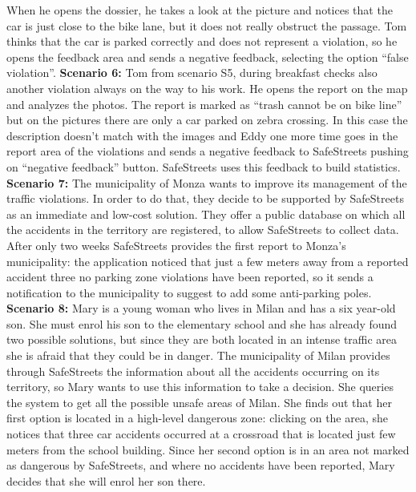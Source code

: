 \documentclass[../RASD.tex]{subfiles}
\begin{document}
                When he opens the dossier, he takes a look at the picture and notices that the car is just close to the bike lane,
                but it does not really obstruct the passage.
                Tom thinks that the car is parked correctly and does not represent a violation, so he opens the feedback area and sends a negative feedback,
                selecting the option “false violation”.
                \newline
                \newline
                \textbf{Scenario 6:} Tom from scenario S5, during breakfast checks also another violation always on the way to his work.
                 He opens the report on the map and analyzes the photos.
                 The report is marked as “trash cannot be on bike line” but on the pictures there are only a car parked on zebra crossing.
                 In this case the description doesn’t match with the images and Eddy one more time goes in the report area of the violations and sends
                 a negative feedback to SafeStreets pushing on “negative feedback” button.
                 SafeStreets uses this feedback to build statistics.
                \newline
                \newline
                \textbf{Scenario 7:} The municipality of Monza wants to improve its management of the traffic violations.
                In order to do that, they decide to be supported by SafeStreets as an immediate and low-cost solution.
                They offer a public database on which all the accidents in the territory are registered, to allow SafeStreets to collect data.
                After only two weeks SafeStreets provides the first report to Monza’s municipality: the application noticed that just a few meters away
                from a reported accident three no parking zone violations have been reported, so it sends a notification to the municipality
                to suggest to add some anti-parking poles.
                \newline
                \newline
                \textbf{Scenario 8:} Mary is a young woman who lives in Milan and has a six year-old son.
                She must enrol his son to the elementary school and she has already found two possible solutions, but since they are both
                located in an intense traffic area she is afraid that they could be in danger.
                The municipality of Milan provides through SafeStreets the information about all the accidents occurring on its territory,
                so Mary wants to use this information to take a decision.
                She queries the system to get all the possible unsafe areas of Milan.
                She finds out that her first option is located in a high-level dangerous zone: clicking on the area, she notices that three car accidents
                occurred at a crossroad that is located just few meters from the school building.
                Since her second option is in an area not marked as dangerous by SafeStreets, and where no accidents have been reported,
                Mary decides that she will enrol her son there.
\end{document}
